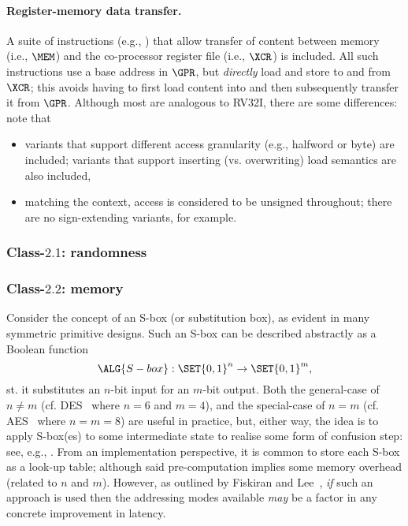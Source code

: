 \paragraph{Register-memory   data transfer.}

A suite of instructions 
(e.g., )
that allow 
transfer of content between
   memory                         (i.e., $\MEM$)
and
the    co-processor register file (i.e., $\XCR$)
is included.
All such instructions use a base address in $\GPR$, but {\em directly} load 
and store to and from $\XCR$; this avoids having to first load content into 
and then subsequently transfer it from $\GPR$.
Although most are analogous to RV32I, there are some differences: note that

\begin{itemize}
\item variants that support different access granularity (e.g., halfword or
      byte) are included; variants that support inserting (vs. overwriting)
      load semantics are also included,
\item matching the context, access is considered to be unsigned throughout;
      there are no sign-extending variants, for example.
\end{itemize}


\subsubsection{Class-$2.1$: randomness}
\label{sec:bg:feature:2:1}



\subsubsection{Class-$2.2$: memory}
\label{sec:bg:feature:2:2}

Consider the concept of an S-box (or substitution box), as evident in many 
symmetric primitive designs.  Such an S-box can be described abstractly as 
a Boolean function
\[
\ALG{S-box} : \SET{ 0, 1 }^{n} \rightarrow \SET{ 0, 1 }^{m} ,
\]
st. it substitutes an $n$-bit input for an $m$-bit output.  Both 
the general-case of $n \neq m$
(cf. DES~\cite{SCARV:FIPS:46_3} where $n = 6$ and $m = 4$),
and 
the special-case of $n =    m$
(cf. AES~\cite{SCARV:FIPS:197}  where $n = m = 8$)
are useful in practice, but, either way, the idea is to apply S-box(es) to
some intermediate state to realise some form of confusion step: see, e.g., 
\cite[Section 1.3]{SCARV:KnuRob:11}.
From an implementation perspective, it is common to store each S-box as a
look-up table; although said pre-computation implies some memory overhead
(related to $n$ and $m$).
However, as outlined by Fiskiran and Lee~\cite{SCARV:FisLee:01}, {\em if}
such an approach is used then the addressing modes available {\em may} be
a factor in any concrete improvement in latency.

